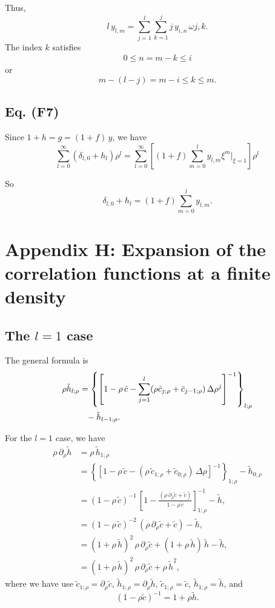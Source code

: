 \documentclass[preprint]{revtex4-1}
\numberwithin{equation}{subsection}
\numberwithin{table}{section}
\begin{document}
Thus,
\[
  l \, y_{l,m}
=
\sum_{j = 1}^{l} \sum_{k = 1}^j
j \, y_{i, n} \, \omega{j, k}.
\]
The index $k$ satisfies
\begin{align*}
   0 \le n = m - k \le i
\end{align*}
or
\[
  m - (l - j) = m - i \le k \le m.
\]


\subsection{Eq. (F7)}

Since $1+h = g = (1+f) \,y$, we have
\[
  \sum_{l = 0}^\infty (\delta_{l,0} + h_{l}) \rho^l
=
  \sum_{l = 0}^\infty
  \left[
    (1 + f) \sum_{m = 0}^l y_{l, m} \xi^m \Big|_{\xi = 1}
  \right] \rho^l
\]

So
\[
  \delta_{l, 0} + h_l
  = (1 + f) \sum_{m=0}^l
  y_{l, m}.
\]



\section{Appendix H: Expansion of the correlation functions at a finite density}


\subsection{The $l = 1$ case}

The general formula is
\begin{align}
  \rho \tilde h_{l;\rho}
&=
\left\{
  \left[
    1 - \rho \, \tilde c
    - \sum_{j = 1}^l
        (\rho \tilde c_{j;\rho} + \tilde c_{j-1;\rho})
          \, \Delta \rho^j
  \right]^{-1}
\right\}_{l;\rho}
\notag \\
&\hphantom{=}- \tilde h_{l-1; \rho}.
\end{align}

For the $l = 1$ case, we have
\begin{align*}
  \rho \, \partial_\rho \tilde h
&=
  \rho \, \tilde h_{1;\rho}
\\
&=
\left\{
  \left[
    1 - \rho \, \tilde c
    - (\rho \, \tilde c_{1;\rho} + \tilde c_{0;\rho})
          \, \Delta \rho
  \right]^{-1}
\right\}_{1; \rho}
  - \tilde h_{0; \rho}
\\
&=
(1 - \rho \, \tilde c)^{-1} \,
\left[
  1 - \frac{ (\rho \, \partial_\rho \tilde c + \tilde c) }
           { 1 - \rho \, \tilde c }
\right]^{-1}_{1;\rho}
- \tilde h,
\\
&=
(1 - \rho \, \tilde c)^{-2} \,
(\rho \, \partial_\rho \tilde c + \tilde c)
- \tilde h,
\\
&=
(1 + \rho \, \tilde h)^2 \,
\rho \, \partial_\rho \tilde c
+ (1 + \rho \, \tilde h) \, \tilde h
- \tilde h,
\\
&=
(1 + \rho \, \tilde h)^2 \,
\rho \, \partial_\rho \tilde c
+ \rho \, \tilde h^2,
\end{align*}
where we have use
$\tilde c_{1;\rho} = \partial_\rho \tilde c$,
$\tilde h_{1;\rho} = \partial_\rho \tilde h$,
$\tilde c_{1;\rho} = \tilde c$,
$\tilde h_{1;\rho} = \tilde h$,
and
\[
  (1 - \rho \tilde c)^{-1}
=
  1 + \rho \tilde h.
\]
\end{document}
